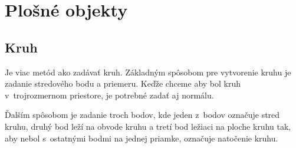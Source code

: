 





\section{Plošné objekty}


\subsection*{Kruh}
Je viac metód ako zadávať kruh. Základným spôsobom pre vytvorenie kruhu je zadanie stredového bodu a priemeru. Keďže chceme aby bol kruh v~trojrozmernom priestore, je potrebné zadať aj normálu. 

Ďalším spôsobom je zadanie troch bodov, kde jeden z~bodov označuje stred kruhu, druhý bod leží na obvode kruhu a tretí bod ležiaci na ploche kruhu tak, aby nebol s~ostatnými bodmi na jednej priamke, označuje natočenie kruhu.

